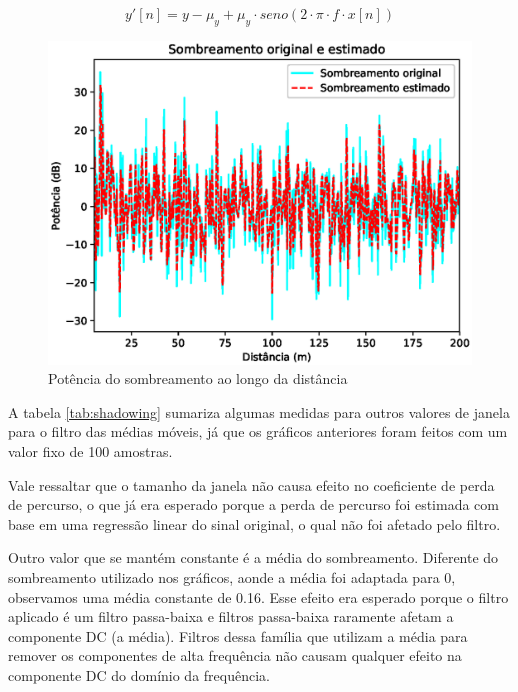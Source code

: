 \documentclass[journal,11pt,twocolumn]{IEEEtran}
\begin{document}
\begin{equation}
    y'[n] = y - \mu_{y} + \mu_{y}\cdot seno(2\cdot \pi \cdot f \cdot x[n])
    \label{move-mean-to-0}
\end{equation}
\begin{figure}[h!]
    \centering
    \includegraphics[scale=0.55]{trial1_shadowing.eps}
    \caption{Potência do sombreamento ao longo da distância}
    \label{fig:trial1-shadowing}
\end{figure}
A tabela \ref{tab:shadowing} sumariza algumas medidas para outros valores de janela para o filtro das médias móveis, já que os gráficos anteriores foram feitos com um valor fixo de 100 amostras.

Vale ressaltar que o tamanho da janela não causa efeito no coeficiente de perda de percurso, o que já era esperado porque a perda de percurso foi estimada com base em uma regressão linear do sinal original, o qual não foi afetado pelo filtro.

Outro valor que se mantém constante é a média do sombreamento. Diferente do sombreamento utilizado nos gráficos, aonde a média foi adaptada para 0, observamos uma média constante de 0.16. Esse efeito era esperado porque o filtro aplicado é um filtro passa-baixa e filtros passa-baixa raramente afetam a componente DC (a média). Filtros dessa família que utilizam a média para remover os componentes de alta frequência não causam qualquer efeito na componente DC do domínio da frequência.
\end{document}
